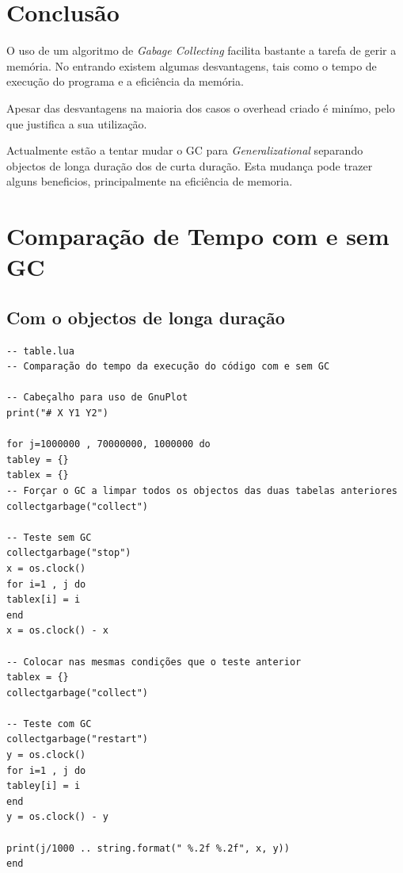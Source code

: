 \documentclass{article}
\begin{document}
%
\section{Conclusão}
\label{sec:conc}
O uso de um algoritmo de \emph{Gabage Collecting} facilita bastante a tarefa de gerir a memória. No entrando existem algumas desvantagens, tais como o tempo de execução do programa e a eficiência da memória.

Apesar das desvantagens na maioria dos casos o overhead criado é minímo, pelo que justifica a sua utilização.

Actualmente estão a tentar mudar o GC para \emph{Generalizational} separando objectos de longa duração dos de curta duração. Esta mudança pode trazer alguns beneficios, principalmente na eficiência de memoria.
%

\newpage
\appendix
\section{Comparação de Tempo com e sem GC}
\subsection{Com o objectos de longa duração}
\begin{verbatim}
-- table.lua
-- Comparação do tempo da execução do código com e sem GC

-- Cabeçalho para uso de GnuPlot
print("# X Y1 Y2")

for j=1000000 , 70000000, 1000000 do
tabley = {}
tablex = {}
-- Forçar o GC a limpar todos os objectos das duas tabelas anteriores
collectgarbage("collect")

-- Teste sem GC
collectgarbage("stop")
x = os.clock()
for i=1 , j do
tablex[i] = i
end
x = os.clock() - x

-- Colocar nas mesmas condições que o teste anterior
tablex = {}
collectgarbage("collect")

-- Teste com GC
collectgarbage("restart")
y = os.clock()
for i=1 , j do
tabley[i] = i
end
y = os.clock() - y

print(j/1000 .. string.format(" %.2f %.2f", x, y))
end
\end{verbatim}
\end{document}
